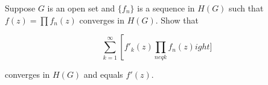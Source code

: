 
Suppose $G$ is an open set and $\{f_n\}$ is a sequence in $H(G)$ such that $f(z) = \prod f_n(z)$ converges in $H(G)$. Show that

$$\sum_{k=1}^{\infty} \left[ f'_k(z) \prod_{n 
eq k} f_n(z) 
ight]$$

converges in $H(G)$ and equals $f'(z)$.
